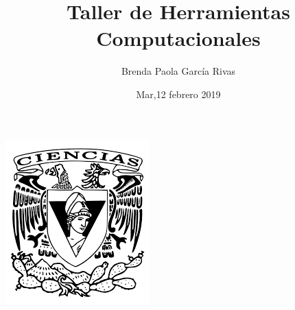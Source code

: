 \documentclass[letterpaper, 12pt, oneside]{article}%
\title{\Huge Taller de Herramientas Computacionales}
\author{Brenda Paola García Rivas}
\date{Mar,12 febrero 2019}
\begin{document}
	\maketitle
	\begin{center}
		\includegraphics[scale=1.0]{1.png}
	\end{center}
	
\end{document}
